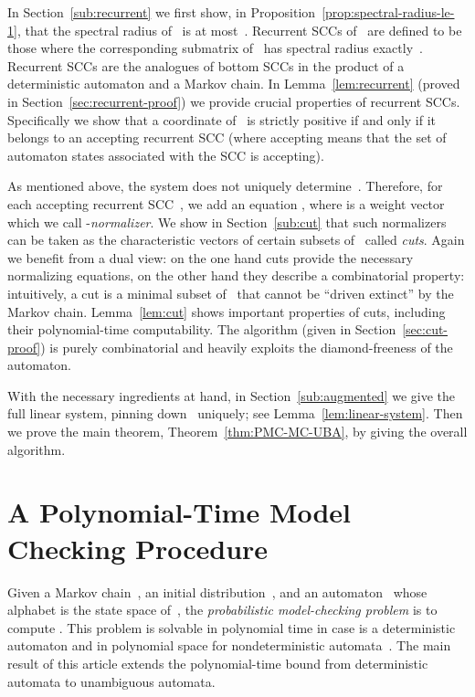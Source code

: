 \documentclass{elsarticle}
\begin{document}
In Section~\ref{sub:recurrent} we first show, in Proposition~\ref{prop:spectral-radius-le-1}, that the spectral radius of~ is at most~.
Recurrent SCCs of~ are defined to be those where the corresponding submatrix of~ has spectral radius exactly~.
Recurrent SCCs are the analogues of bottom SCCs in the product of a deterministic automaton and a Markov chain.
In Lemma~\ref{lem:recurrent} (proved in Section~\ref{sec:recurrent-proof}) we provide crucial properties of recurrent SCCs.
Specifically we show that a coordinate of~ is strictly positive if and only if it belongs to an accepting recurrent SCC (where accepting means that the set of automaton states associated with the SCC is accepting).

As mentioned above, the system  does not uniquely determine~.
Therefore, for each accepting recurrent SCC~, we add an equation , where  is a weight vector which we call -\emph{normalizer}.
We show in Section~\ref{sub:cut} that such normalizers can be taken as the characteristic vectors of certain subsets of~ called \emph{cuts}.
Again we benefit from a dual view: on the one hand cuts provide the necessary normalizing equations, on the other hand they describe a combinatorial property: intuitively, a cut is a minimal subset of~ that cannot be ``driven extinct'' by the Markov chain.
Lemma~\ref{lem:cut} shows important properties of cuts, including their polynomial-time computability.
The algorithm (given in Section~\ref{sec:cut-proof}) is purely combinatorial and heavily exploits the diamond-freeness of the automaton.

With the necessary ingredients at hand, in Section~\ref{sub:augmented} we give the full linear system, pinning down~ uniquely; see Lemma~\ref{lem:linear-system}.
Then we prove the main theorem, Theorem~\ref{thm:PMC-MC-UBA}, by giving the overall algorithm.

\section{A Polynomial-Time Model Checking Procedure}
\label{sec:uba}

Given a Markov chain~, an initial distribution~, and an
automaton~ whose alphabet is the state space of~, the
\emph{probabilistic model-checking problem} is to compute
.  This problem is solvable in polynomial
time in case  is a deterministic automaton and in polynomial space for nondeterministic automata~\cite{CY95,BusRubVar04}.
The main result of this article
extends the polynomial-time bound from deterministic automata to
unambiguous automata.
\end{document}
